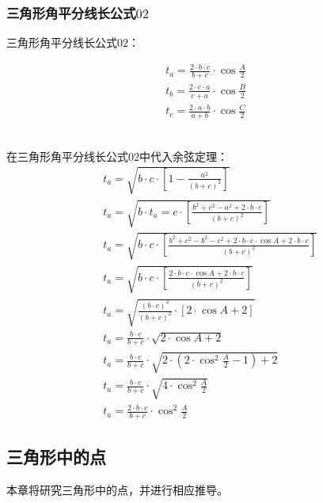 \documentclass[UTF8]{ctexart}
\begin{document}
\newpage

\subsubsection{三角形角平分线长公式$02$}
    三角形角平分线长公式$02$：
    \begin{large}
        \begin{align*}
            t_a=\frac{2\cdot b\cdot c}{b+c}\cdot\cos{\frac{A}{2}}\\[3mm]
            t_b=\frac{2\cdot c\cdot a}{c+a}\cdot\cos{\frac{B}{2}}\\[3mm]
            t_c=\frac{2\cdot a\cdot b}{a+b}\cdot\cos{\frac{C}{2}}
        \end{align*}
    \end{large}\\
    在三角形角平分线长公式$02$中代入余弦定理：\vspace{8pt}
    \setcounter{equation}{0}
    \begin{align}
        &t_a=\sqrt{b\cdot c\cdot\left[1-\frac{a^2}{(b+c)^2}\right]}\\[3mm]
        &t_a=\sqrt{b\cdot t_a=c\cdot\left[\frac{b^2+c^2-a^2+2\cdot b\cdot c}{(b+c)^2}\right]}\\[3mm]
        &t_a=\sqrt{b\cdot c\cdot\left[\frac{b^2+c^2-b^2-c^2+2\cdot b\cdot c\cdot\cos{A}+2\cdot b\cdot c}{(b+c)^2}\right]}\\[3mm]
        &t_a=\sqrt{b\cdot c\cdot\left[\frac{2\cdot b\cdot c\cdot\cos{A}+2\cdot b\cdot c}{(b+c)^2}\right]}\\[3mm]
        &t_a=\sqrt{\frac{(b\cdot c)^2}{(b+c)^2}\cdot\left[2\cdot\cos{A}+2\right]}\\[3mm]
        &t_a=\frac{b\cdot c}{b+c}\cdot\sqrt{2\cdot\cos{A}+2}\\[3mm]
        &t_a=\frac{b\cdot c}{b+c}\cdot\sqrt{2\cdot\left(2\cdot\cos^2{\frac{A}{2}}-1\right)+2}\\[3mm]
        &t_a=\frac{b\cdot c}{b+c}\cdot\sqrt{4\cdot\cos^2{\frac{A}{2}}}\\[3mm]
        &t_a=\frac{2\cdot b\cdot c}{b+c}\cdot\cos^2{\frac{A}{2}}
    \end{align}

\newpage

\subsection{三角形中的点}
    本章将研究三角形中的点，并进行相应推导。
\end{document}
